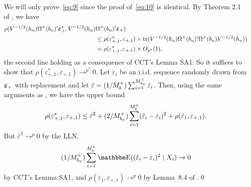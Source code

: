 \documentclass[12pt,fleqn]{article}
\begin{document}
We will only prove~\eqref{eq:9} since the proof of~\eqref{eq:10} is
identical. By Theorem 2.1 of \cite{freedman1981}, we have
\begin{align*}
  \rho(V^{-1/2}(h_n) \Omega^{+}(b_n)'\boldsymbol{\varepsilon}_{+}^{*}, V^{-1/2}(h_n)&\Omega^{+}(b_n)'\boldsymbol{\varepsilon}_{+}) \\
  &\leq \rho(\varepsilon_{+,1}^{*}, \varepsilon_{+,1}) \times
    \operatorname{tr}(V^{-1/2}(h_n) \Omega^{+}(b_n)' \Omega^{+}(b_n)V^{-1/2}(h_n)) \\
  &= \rho(\varepsilon_{+,1}^{*}, \varepsilon_{+,1}) \times O_{p^{*}}(1),
\end{align*}
the second line holding as a consequence of CCT's Lemma SA1. So it suffices
to show that $\rho(\varepsilon_{+,1}^{*}, \varepsilon_{+,1}) \to^{p^{*}} 0$. Let
$\dot{\varepsilon}_i$ be an i.i.d. sequence randomly drawn from $\boldsymbol{\varepsilon}_+$
with replacement and let
$\bar{\varepsilon} = (1/M_b^{+}) \sum_{i = 1}^{M_{b_n}^{\pm}} \dot{\varepsilon}_i$. Then,
using the same arguments as \cite{freedman1981}, we have the upper bound
\begin{equation}
  \label{eq:12}
  \rho(\varepsilon_{+,1}^*, \varepsilon_{+,1})
  \leq
  \bar\varepsilon^2 +
  (2/M_{b_n}^+) \osum[+]{i}{b} (\hat\varepsilon_i - \varepsilon_i)^2
  + \rho(\dot\varepsilon_1, \varepsilon_{+,1}).
\end{equation}
But $\bar\varepsilon^2 \to^p 0$ by the LLN,
\[
  (1/M_{b_n}^+) \osum[+]{i}{b}
  \E((\hat\varepsilon_i - \varepsilon_i)^2 \mid X_i) \to 0
\]
by CCT's Lemma SA1, and
$\rho(\dot\varepsilon_1, \varepsilon_{+,1}) \to^p 0$ by Lemma~8.4 of
\cite{bickel1981}.\qed

\clearpage


\end{document}
